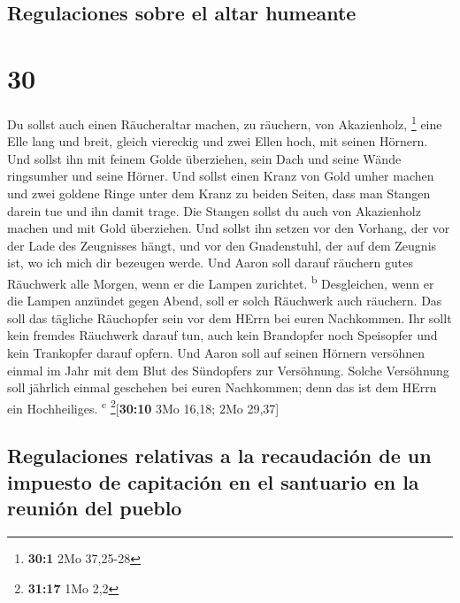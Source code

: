\hypertarget{regulaciones-sobre-el-altar-humeante}{%
\subsection{Regulaciones sobre el altar
humeante}\label{regulaciones-sobre-el-altar-humeante}}

\hypertarget{section-29}{%
\section{30}\label{section-29}}

 Du sollst auch einen Räucheraltar machen, zu räuchern,
von Akazienholz, \footnote{\textbf{30:1} 2Mo 37,25-28} 
eine Elle lang und breit, gleich viereckig und zwei Ellen hoch, mit
seinen Hörnern.  Und sollst ihn mit feinem Golde
überziehen, sein Dach und seine Wände ringsumher und seine Hörner. Und
sollst einen Kranz von Gold umher machen  und zwei goldene
Ringe unter dem Kranz zu beiden Seiten, dass man Stangen darein tue und
ihn damit trage.  Die Stangen sollst du auch von
Akazienholz machen und mit Gold überziehen.  Und sollst
ihn setzen vor den Vorhang, der vor der Lade des Zeugnisses hängt, und
vor den Gnadenstuhl, der auf dem Zeugnis ist, wo ich mich dir bezeugen
werde.  Und Aaron soll darauf räuchern gutes Räuchwerk
alle Morgen, wenn er die Lampen zurichtet. \textsuperscript{b}
 Desgleichen, wenn er die Lampen anzündet gegen Abend,
soll er solch Räuchwerk auch räuchern. Das soll das tägliche Räuchopfer
sein vor dem HErrn bei euren Nachkommen.  Ihr sollt kein
fremdes Räuchwerk darauf tun, auch kein Brandopfer noch Speisopfer und
kein Trankopfer darauf opfern.  Und Aaron soll auf seinen
Hörnern versöhnen einmal im Jahr mit dem Blut des Sündopfers zur
Versöhnung. Solche Versöhnung soll jährlich einmal geschehen bei euren
Nachkommen; denn das ist dem HErrn ein Hochheiliges. \textsuperscript{c}
\footnote{\textbf{31:17} 1Mo 2,2}{[}\textbf{30:10} 3Mo 16,18; 2Mo
29,37{]}

\hypertarget{regulaciones-relativas-a-la-recaudaciuxf3n-de-un-impuesto-de-capitaciuxf3n-en-el-santuario-en-la-reuniuxf3n-del-pueblo}{%
\subsection{Regulaciones relativas a la recaudación de un impuesto de
capitación en el santuario en la reunión del
pueblo}\label{regulaciones-relativas-a-la-recaudaciuxf3n-de-un-impuesto-de-capitaciuxf3n-en-el-santuario-en-la-reuniuxf3n-del-pueblo}}

